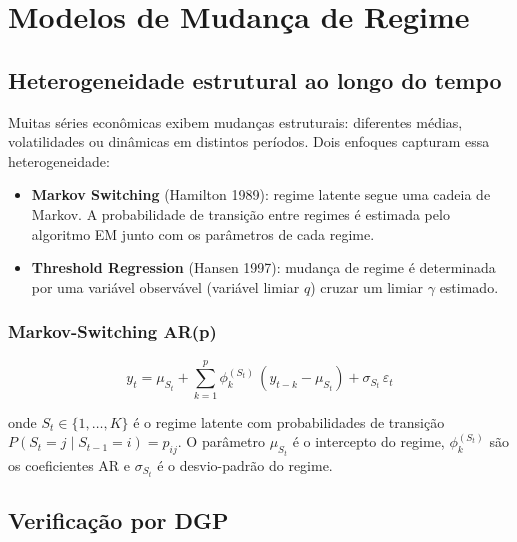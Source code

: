 \chapter{Modelos de Mudança de Regime}
\label{cap:regime}

\section{Heterogeneidade estrutural ao longo do tempo}

Muitas séries econômicas exibem mudanças estruturais: diferentes médias,
volatilidades ou dinâmicas em distintos períodos. Dois enfoques capturam
essa heterogeneidade:

\begin{itemize}
  \item \textbf{Markov Switching} (Hamilton 1989): regime latente segue uma
  cadeia de Markov. A probabilidade de transição entre regimes é estimada
  pelo algoritmo EM junto com os parâmetros de cada regime.
  \item \textbf{Threshold Regression} (Hansen 1997): mudança de regime é
  determinada por uma variável observável (variável limiar $q$) cruzar um
  limiar $\gamma$ estimado.
\end{itemize}

\subsection*{Markov-Switching AR(p)}

\[
  y_t = \mu_{S_t} + \sum_{k=1}^p \phi_k^{(S_t)}\,(y_{t-k} - \mu_{S_t}) + \sigma_{S_t}\,\varepsilon_t
\]

onde $S_t \in \{1,\ldots,K\}$ é o regime latente com probabilidades de
transição $P(S_t = j \mid S_{t-1} = i) = p_{ij}$. O parâmetro $\mu_{S_t}$
é o intercepto do regime, $\phi_k^{(S_t)}$ são os coeficientes AR e
$\sigma_{S_t}$ é o desvio-padrão do regime.

\section{Verificação por DGP}

